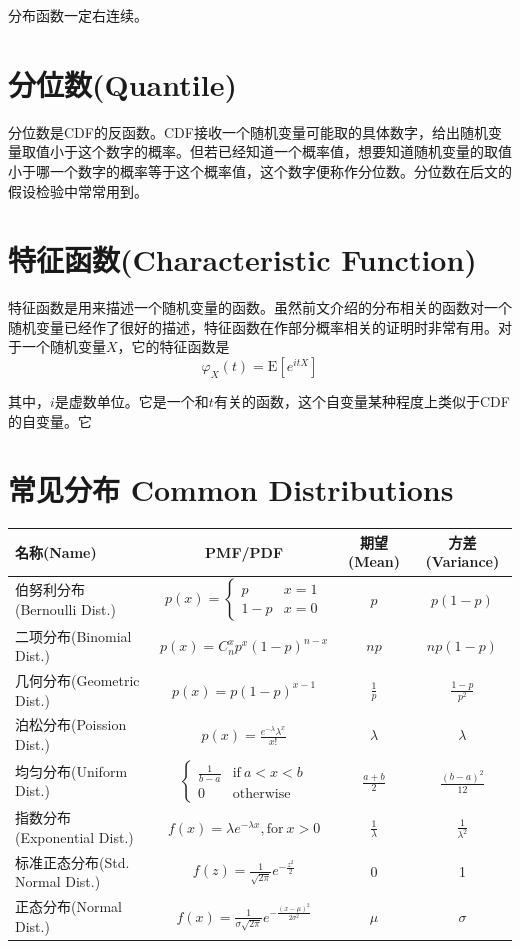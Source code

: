 \documentclass[UTF8]{ctexbook}
\begin{document}
分布函数一定右连续。
\section{分位数(Quantile)}
分位数是CDF的反函数。CDF接收一个随机变量可能取的具体数字，给出随机变量取值小于这个数字的概率。但若已经知道一个概率值，想要知道随机变量的取值小于哪一个数字的概率等于这个概率值，这个数字便称作分位数。分位数在后文的假设检验中常常用到。
\section{特征函数(Characteristic Function)}
\label{characteristic-function}
特征函数是用来描述一个随机变量的函数。虽然前文介绍的分布相关的函数对一个随机变量已经作了很好的描述，特征函数在作部分概率相关的证明时非常有用。对于一个随机变量$X$，它的特征函数是
\[
	\varphi_X(t)=\mathrm E[e^{itX}]
\]

其中，$i$是虚数单位。它是一个和$t$有关的函数，这个自变量某种程度上类似于CDF的自变量。它
\section{常见分布 Common Distributions}
\renewcommand{\arraystretch}{2.1}
\begin{center}
    \begin{tabular}{|l|c|c|c|}
\hline\hline
     名称(Name)&PMF/PDF&期望(Mean)&方差(Variance) \\ \hline
     伯努利分布(Bernoulli Dist.)& $p(x)=\begin{cases} p &x=1 \\ 1-p &x=0 \end{cases}$& $p$& $p(1-p)$ \\ \hline
     二项分布(Binomial Dist.)& $p(x)=C_n^xp^x(1-p)^{n-x}$& $np$& $np(1-p)$ \\ \hline
     几何分布(Geometric Dist.)& $p(x)=p(1-p)^{x-1}$& $\frac{1}{p}$& $\frac{1-p}{p^2}$ \\ \hline
     泊松分布(Poission Dist.)& $p(x)=\frac{e^{-\lambda}\lambda^x}{x!}$& $\lambda$& $\lambda$ \\ \hline
     均匀分布(Uniform Dist.)& $\begin{cases} \frac{1}{b-a} &\text{if}\ a<x<b \\ 0 &\text{otherwise} \end{cases}$& $\frac{a+b}{2}$& $\frac{(b-a)^2}{12}$ \\ \hline
     指数分布(Exponential Dist.)& $f(x)=\lambda e^{-\lambda x}, \text{for}\ x>0$& $\frac{1}{\lambda}$& $\frac{1}{\lambda^2}$ \\ \hline
     标准正态分布(Std. Normal Dist.)& $f(z)=\frac{1}{\sqrt{2\pi}}e^{-\frac{z^2}{2}}$& 0& 1\\ \hline
     正态分布(Normal Dist.)&$f(x)=\frac{1}{\sigma\sqrt{2\pi}}e^{-\frac{(x-\mu)^2}{2\sigma^2}}$& $\mu$& $\sigma$\\ \hline
\hline
\end{tabular}
\end{center}
\renewcommand{\arraystretch}{1}
\end{document}
